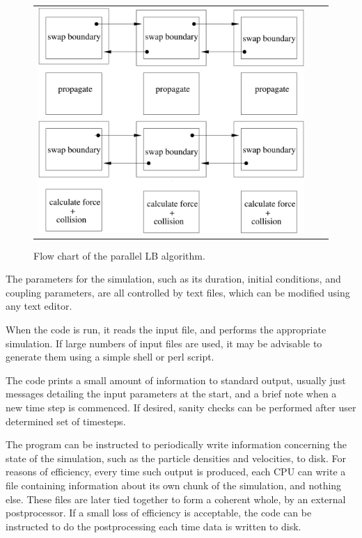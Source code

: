 \documentclass[a4paper]{article}
\begin{document}
\begin{figure}[h]
 	 \begin{tabular}{@{}ccl@{}}
	\includegraphics[width=6.20in]{parallel.pdf} &
   	\end{tabular}
   \vfill
 \caption{Flow chart of the parallel LB algorithm.}
\label{fig:flowchart}
\end{figure}

The parameters for the simulation, such as its duration, initial conditions,
and coupling parameters, are all controlled by text files, which can be
modified using any text editor.

When the code is run, it reads the input file, and performs the appropriate
simulation. If large numbers of input files are used, it may be advisable to
generate them using a simple shell or perl script.

The code prints a small amount of information to standard output, usually just
messages detailing the input parameters at the start, and a brief note when a
new time step is commenced. If desired, sanity checks can be performed after
user determined set of timesteps.

The program can be instructed to periodically write information
concerning the state of the simulation, such as the particle densities
and velocities, to disk. For reasons of efficiency, every time such
output is produced, each CPU can write a file containing information about
its own chunk of the simulation, and nothing else. These files are later tied
together to form a coherent whole, by an external postprocessor. If a small
loss of efficiency is acceptable, the code can be instructed to do the
postprocessing each time data is written to disk.
\end{document}
